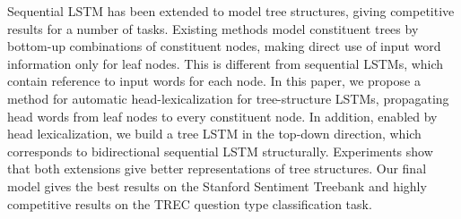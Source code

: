 Sequential LSTM has been extended to model tree structures, giving competitive results for a number of tasks.  Existing methods model constituent trees by bottom-up combinations of constituent nodes, making direct use of input word information only for leaf nodes.  This is different from sequential LSTMs, which contain reference to input words for each node.  In this paper, we propose a method for automatic head-lexicalization for tree-structure LSTMs, propagating head words from leaf nodes to every constituent node.  In addition, enabled by head lexicalization, we build a tree LSTM in the top-down direction, which corresponds to bidirectional sequential LSTM structurally. Experiments show that both extensions give better representations of tree structures. Our final model gives the best results on the Stanford Sentiment Treebank and highly competitive results on the TREC question type classification task.